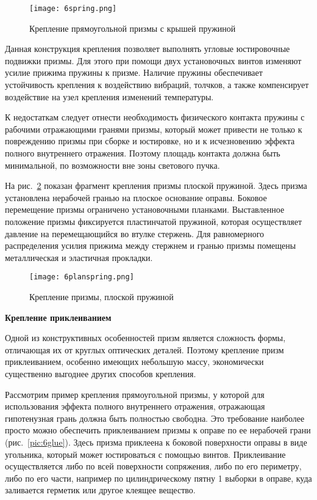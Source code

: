 \begin{figure}[h!]
	\caption{ Крепление прямоугольной призмы с крышей пружиной }
	\texttt{[image: 6spring.png]}
	\label{pic:6spring}
\end{figure}

Данная конструкция крепления позволяет выполнять угловые юстировочные подвижки призмы. Для этого при помощи двух установочных винтов изменяют усилие прижима пружины к призме. Наличие пружины обеспечивает устойчивость крепления к воздействию вибраций, толчков, а также компенсирует воздействие на узел крепления изменений температуры.

К недостаткам следует отнести необходимость физического контакта пружины с рабочими отражающими гранями призмы, который может привести не только к повреждению призмы при сборке и юстировке, но и к исчезновению эффекта полного внутреннего отражения. Поэтому площадь контакта должна быть минимальной, по возможности вне зоны светового пучка.

На рис.~\ref{pic:6planspring} показан фрагмент крепления призмы плоской пружиной. Здесь призма установлена нерабочей гранью на плоское основание оправы. Боковое перемещение призмы ограничено установочными планками. Выставленное положение призмы фиксируется пластинчатой пружиной, которая осуществляет давление на перемещающийся во втулке стержень. Для равномерного распределения усилия прижима между стержнем и гранью призмы помещены металлическая и эластичная прокладки.

\begin{figure}[h!]
	\caption{ Крепление призмы, плоской пружиной }
	\texttt{[image: 6planspring.png]}
	\label{pic:6planspring}
\end{figure} 

\begin{flushleft}
	\textbf{Крепление приклеиванием}
\end{flushleft}

Одной из конструктивных особенностей призм является сложность формы, отличающая их от круглых оптических деталей. Поэтому крепление призм приклеиванием, особенно имеющих небольшую массу, экономически существенно выгоднее других способов крепления.

Рассмотрим пример крепления прямоугольной призмы, у которой для использования эффекта полного внутреннего отражения, отражающая гипотенузная грань должна быть полностью свободна. Это требование наиболее просто можно обеспечить приклеиванием призмы к оправе по ее нерабочей грани (рис.~\ref{pic:6glue}). Здесь призма приклеена к боковой поверхности оправы в виде угольника, который может юстироваться с помощью винтов. Приклеивание осуществляется либо по всей поверхности сопряжения, либо по его периметру, либо по его части, например по цилиндрическому пятну 1 выборки в оправе, куда заливается герметик или другое клеящее вещество.

